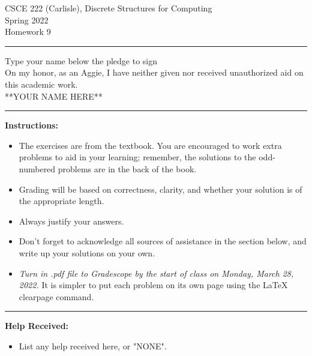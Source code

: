 \documentclass[12pt]{article}  %
\begin{document}
\begin{center}         %
{\large                %
CSCE 222 (Carlisle), Discrete Structures for Computing \\  %
Spring 2022 \\
Homework 9}
\end{center}
\rule{6in}{.1pt}       %
\begin{center}
{\large
Type your name below the pledge to sign\\
On my honor, as an Aggie, I have neither given nor received unauthorized aid on this academic work.\\
**YOUR NAME HERE**}
\end{center}


\rule{6in}{.1pt}       %
                    
\noindent              %
{\bf Instructions:}    %

\begin{itemize}        %
\item The exercises are from the textbook.  You are encouraged to work
      extra problems to aid in your learning; remember, the solutions to 
      the odd-numbered problems are in the back of the book.
\item Grading will be based on correctness, clarity, and whether your
      solution is of the appropriate length.
\item Always justify your answers.
\item Don't forget to acknowledge all sources of assistance in the section below, and write up your solutions on your own.
\item {\em Turn in .pdf file to Gradescope by the start of class on Monday, March 28, 2022.}  It is simpler to put each problem on its own page using the LaTeX clearpage command.
\end{itemize}


\rule{6in}{.1pt}       %

{\bf Help Received:}    %
\begin{itemize}
\item List any help received here, or "NONE".
\end{itemize}
\end{document}
